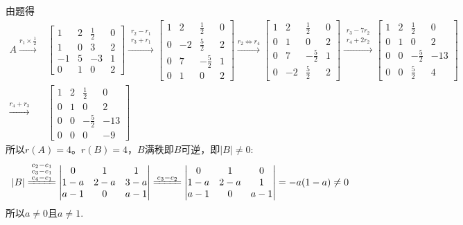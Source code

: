 \documentclass{article}
\begin{document}
\begin{jie}
由题得
\begin{align*}
A\xrightarrow{r_{1}\times \frac{1}{2}}&
{
\begin{bmatrix}
   1 & 2 & \frac{1}{2} & 0\\
   1 & 0 & 3 & 2\\
   -1 & 5 & -3 & 1\\
   0 & 1 & 0 & 2
  \end{bmatrix}
}\xrightarrow{ \substack{r_{2}-r_{1} \\ r_{3}+r_{1}}}
{
\begin{bmatrix}
   1 & 2 & \frac{1}{2} & 0\\
   0 & -2 & \frac{5}{2} & 2\\
   0 & 7 & -\frac{5}{2} & 1\\
   0 & 1 & 0 & 2
  \end{bmatrix}
}\xrightarrow{r_{2}\Leftrightarrow r_{4}}
{
\begin{bmatrix}
   1 & 2 & \frac{1}{2} & 0\\
   0 & 1 & 0 & 2\\
   0 & 7 & -\frac{5}{2} & 1\\
   0 & -2 & \frac{5}{2} & 2
  \end{bmatrix}
}\xrightarrow{\substack{r_{3}-7 r_{2} \\ r_{4}+2r_{2}}}
{
\begin{bmatrix}
   1 & 2 & \frac{1}{2} & 0\\
   0 & 1 & 0 & 2\\
   0 & 0 & -\frac{5}{2} & -13\\
   0 & 0 & \frac{5}{2} & 4
  \end{bmatrix}
}\\
\xrightarrow{r_{4}+ r_{3}}&
{
\begin{bmatrix}
   1 & 2 & \frac{1}{2} & 0\\
   0 & 1 & 0 & 2\\
   0 & 0 & -\frac{5}{2} & -13\\
   0 & 0 & 0 & -9
  \end{bmatrix}
}
\end{align*}
所以$r(A)=4$。$r(B)=4$，$B$满秩即$B$可逆，即$|B|\neq0$:
\begin{equation*}
|B|\xlongequal{\substack{c_{2}-c_{1}\\ c_{3}-c_{1}\\ c_{4}-c_{1}}}
\begin{vmatrix}
0 & 1 & 1\\
1-a & 2-a & 3-a\\
a-1 & 0 & a-1
\end{vmatrix}\xlongequal{\substack{ c_{3}-c_{2}}}
\begin{vmatrix}
0 & 1 & 0\\
1-a & 2-a & 1\\
a-1 & 0 & a-1
\end{vmatrix}=-a(1-a)\neq0
\end{equation*}
所以$a\neq0$且$a\neq1$.
\end{jie}
\end{document}
